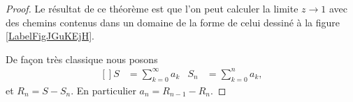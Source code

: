 \begin{proof}

    Le résultat de ce théorème est que l'on peut calculer la limite \( z\to 1\) avec des chemins contenus dans un domaine de la forme de celui dessiné à la figure \ref{LabelFigJGuKEjH}. %
    \newcommand{\CaptionFigJGuKEjH}{La zone dans laquelle peut être le chemin qui va vers \( z=1\).}
    

    De façon très classique nous posons
    \begin{equation}
        \begin{aligned}[]
            S&=\sum_{k=0}^{\infty}a_k&S_n&=\sum_{k=0}^na_k,
        \end{aligned}
    \end{equation}
    et \( R_n=S-S_n\). En particulier \( a_n=R_{n-1}-R_n\). 


\end{proof}
